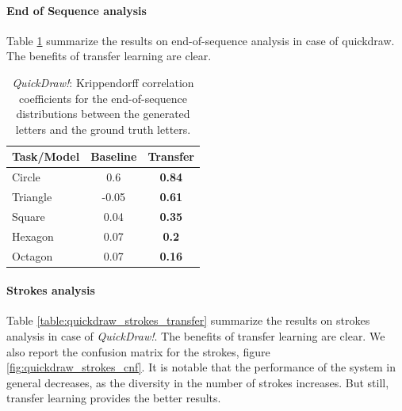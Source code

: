       \paragraph{End of Sequence analysis}
        Table \ref{table:quickdraw_eos_transfer} summarize the results on end-of-sequence analysis in case of quickdraw. The benefits of transfer learning are clear.
        \begin{table}[!htbp]
          \centering
          \begin{tabular}{l c c} \hline

          Task/Model & Baseline & Transfer \\ \hline
          Circle &  0.6 & \textbf{0.84} \\ %
          Triangle & -0.05 & \textbf{0.61} \\ %
          Square &  0.04 &  \textbf{0.35} \\ %
          Hexagon &  0.07 &  \textbf{0.2} \\ %
          Octagon &  0.07 &  \textbf{0.16} \\ \hline

          \end{tabular}
          \caption{\textit{QuickDraw!}: Krippendorff correlation coefficients for the end-of-sequence distributions between the generated letters and the ground truth letters.}
          \label{table:quickdraw_eos_transfer}
        \end{table}

      \paragraph{Strokes analysis}
        Table \ref{table:quickdraw_strokes_transfer} summarize the results on strokes analysis in case of \textit{QuickDraw!}. The benefits of transfer learning are clear. We also report the confusion matrix for the strokes, figure \ref{fig:quickdraw_strokes_cnf}. It is notable that the performance of the system in general decreases, as the diversity in the number of strokes increases. But still, transfer learning provides the better results.

